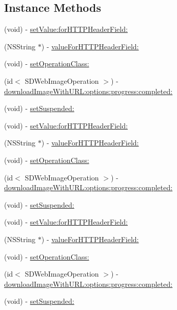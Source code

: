 \subsection*{Instance Methods}
\begin{DoxyCompactItemize}
\item 
(void) -\/ \mbox{\hyperlink{interface_s_d_web_image_downloader_a119389f3da3de86ef65fd86f76169acb}{set\+Value\+:for\+H\+T\+T\+P\+Header\+Field\+:}}
\item 
(N\+S\+String $\ast$) -\/ \mbox{\hyperlink{interface_s_d_web_image_downloader_a35c47c9cf43fbce253153417f5f9f2f4}{value\+For\+H\+T\+T\+P\+Header\+Field\+:}}
\item 
(void) -\/ \mbox{\hyperlink{interface_s_d_web_image_downloader_a27a55eb9ae3c7b1c9f3a2617420390e9}{set\+Operation\+Class\+:}}
\item 
(id$<$ S\+D\+Web\+Image\+Operation $>$) -\/ \mbox{\hyperlink{interface_s_d_web_image_downloader_ab3f450ead0af7471b98a980a41e0d021}{download\+Image\+With\+U\+R\+L\+:options\+:progress\+:completed\+:}}
\item 
(void) -\/ \mbox{\hyperlink{interface_s_d_web_image_downloader_aa477f2fb00e135fbaa7cef40111feb06}{set\+Suspended\+:}}
\item 
(void) -\/ \mbox{\hyperlink{interface_s_d_web_image_downloader_a119389f3da3de86ef65fd86f76169acb}{set\+Value\+:for\+H\+T\+T\+P\+Header\+Field\+:}}
\item 
(N\+S\+String $\ast$) -\/ \mbox{\hyperlink{interface_s_d_web_image_downloader_a35c47c9cf43fbce253153417f5f9f2f4}{value\+For\+H\+T\+T\+P\+Header\+Field\+:}}
\item 
(void) -\/ \mbox{\hyperlink{interface_s_d_web_image_downloader_a27a55eb9ae3c7b1c9f3a2617420390e9}{set\+Operation\+Class\+:}}
\item 
(id$<$ S\+D\+Web\+Image\+Operation $>$) -\/ \mbox{\hyperlink{interface_s_d_web_image_downloader_acd58e4bb722c6b283929c39cfb070f32}{download\+Image\+With\+U\+R\+L\+:options\+:progress\+:completed\+:}}
\item 
(void) -\/ \mbox{\hyperlink{interface_s_d_web_image_downloader_aa477f2fb00e135fbaa7cef40111feb06}{set\+Suspended\+:}}
\item 
(void) -\/ \mbox{\hyperlink{interface_s_d_web_image_downloader_a119389f3da3de86ef65fd86f76169acb}{set\+Value\+:for\+H\+T\+T\+P\+Header\+Field\+:}}
\item 
(N\+S\+String $\ast$) -\/ \mbox{\hyperlink{interface_s_d_web_image_downloader_a35c47c9cf43fbce253153417f5f9f2f4}{value\+For\+H\+T\+T\+P\+Header\+Field\+:}}
\item 
(void) -\/ \mbox{\hyperlink{interface_s_d_web_image_downloader_a27a55eb9ae3c7b1c9f3a2617420390e9}{set\+Operation\+Class\+:}}
\item 
(id$<$ S\+D\+Web\+Image\+Operation $>$) -\/ \mbox{\hyperlink{interface_s_d_web_image_downloader_acd58e4bb722c6b283929c39cfb070f32}{download\+Image\+With\+U\+R\+L\+:options\+:progress\+:completed\+:}}
\item 
(void) -\/ \mbox{\hyperlink{interface_s_d_web_image_downloader_aa477f2fb00e135fbaa7cef40111feb06}{set\+Suspended\+:}}
\end{DoxyCompactItemize}
